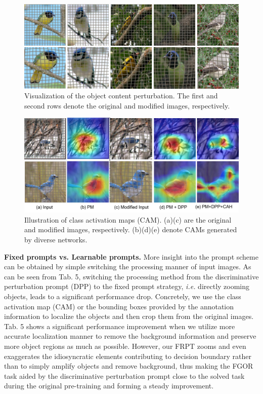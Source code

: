 \documentclass[letterpaper]{article} %
\begin{document}
\begin{figure}[!t]
\centering



    \includegraphics[width = 0.9\linewidth]{sample.png}
    \caption{Visualization of the object content perturbation. The first and second rows denote the original and modified images, respectively.}
    
\end{figure}
\begin{figure}[!t]
\centering
    \includegraphics[width = 0.9\linewidth]{sam.png}
    \caption{ Illustration of class activation maps (CAM). (a)(c) are the original and modified images, respectively. (b)(d)(e) denote CAMs generated by diverse networks.}


\end{figure}



\textbf{Fixed prompts vs. Learnable prompts.} More insight into the prompt scheme can be obtained by simple switching the processing manner of input images. As can be seen from Tab. 5, switching the processing method from the discriminative perturbation prompt (DPP) to the fixed prompt strategy, \textit{i.e.} directly zooming objects, leads to a significant performance drop.
Concretely, we use the class activation map (CAM) or the bounding boxes provided by the annotation information to localize the objects and then crop them from the original images. Tab. 5 shows a significant performance improvement when we utilize more accurate localization manner to remove the background information and preserve more object regions as much as possible. However, our FRPT zooms and even exaggerates the idiosyncratic elements contributing to decision boundary rather than to simply amplify objects and remove background, thus making the FGOR task aided by the discriminative perturbation prompt close to the solved task during the original pre-training and forming a steady improvement.
\end{document}

